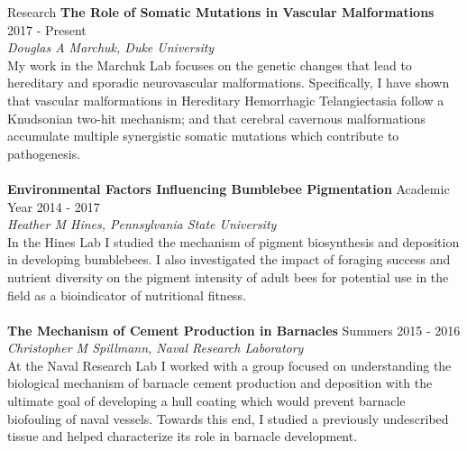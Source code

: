 \documentclass{resume} %
\begin{document}
\begin{rSection}{Research}
{\bf The Role of Somatic Mutations in Vascular Malformations} \hfill {2017 - Present} \\
\textit{Douglas A Marchuk, Duke University} \\
My work in the Marchuk Lab focuses on the genetic changes that lead to
hereditary and sporadic neurovascular malformations. Specifically, I have shown
that vascular malformations in Hereditary Hemorrhagic Telangiectasia follow a Knudsonian
two-hit mechanism; and that cerebral cavernous malformations accumulate multiple synergistic somatic
mutations which contribute to pathogenesis.  \\\\
{\bf Environmental Factors Influencing Bumblebee Pigmentation} \hfill {Academic Year 2014 - 2017} \\
\textit{Heather M Hines, Pennsylvania State University} \\
In the Hines Lab I studied the mechanism of pigment biosynthesis and deposition in developing bumblebees.
I also investigated the impact of foraging success and nutrient diversity on the pigment intensity of adult bees
for potential use in the field as a bioindicator of nutritional fitness. \\\\
{\bf The Mechanism of Cement Production in Barnacles} \hfill {Summers 2015 - 2016} \\
\textit{Christopher M Spillmann, Naval Research Laboratory} \\
At the Naval Research Lab I worked with a group focused on understanding the biological mechanism of
barnacle cement production and deposition with the ultimate goal of developing a hull coating which 
would prevent barnacle biofouling of naval vessels. Towards this end, I studied a previously
undescribed tissue and helped characterize its role in barnacle development. \\
\end{rSection}
\end{document}
